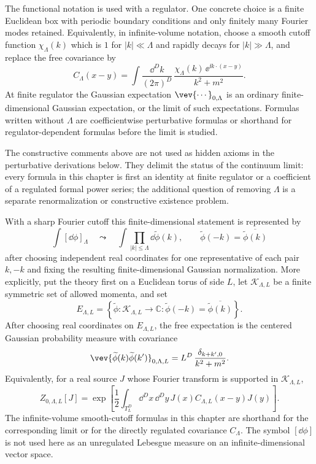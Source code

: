 \begin{definition}
The functional notation is used with a regulator. One concrete choice is a
finite Euclidean box with periodic boundary conditions and only finitely many
Fourier modes retained. Equivalently, in infinite-volume notation, choose a
smooth cutoff function \(\chi_\Lambda(k)\) which is \(1\) for
\(|k|\ll\Lambda\) and rapidly decays for \(|k|\gg\Lambda\), and replace the
free covariance by
\[
  C_\Lambda(x-y)
  =
  \int \frac{\dd^D k}{(2\pi)^D}\,
  \frac{\chi_\Lambda(k)\,\ee^{\ii k\cdot(x-y)}}
  {k^2+m^2}.
\]
At finite regulator the Gaussian expectation \(\vev{\cdots}_{0,\Lambda}\) is
an ordinary finite-dimensional Gaussian expectation, or the limit of such
expectations. Formulas written without \(\Lambda\) are coefficientwise
perturbative formulas or shorthand for regulator-dependent formulas before
the limit is studied.
\end{definition}

\begin{remark}
The constructive comments above are not used as hidden axioms in the
perturbative derivations below.  They delimit the status of the continuum
limit: every formula in this chapter is first an identity at finite regulator
or a coefficient of a regulated formal power series; the additional question
of removing \(\Lambda\) is a separate renormalization or constructive
existence problem.
\end{remark}

\begin{definition}
\label{def:finite-fourier-cutoff-gaussian-scalar-datum}
With a sharp Fourier cutoff this finite-dimensional statement is represented
by
\[
  \int[\dd\phi]_\Lambda
  \quad\leadsto\quad
  \int\prod_{|k|\le\Lambda}\dd\widetilde\phi(k),
  \qquad
  \widetilde\phi(-k)=\overline{\widetilde\phi(k)}
\]
after choosing independent real coordinates for one representative of each
pair \(k,-k\) and fixing the resulting finite-dimensional Gaussian
normalization.  More explicitly, put the theory first on a Euclidean torus of
side \(L\), let \(\mathcal K_{\Lambda,L}\) be a finite symmetric set of
allowed momenta, and set
\[
  E_{\Lambda,L}
  =
  \left\{
    \widetilde\phi:\mathcal K_{\Lambda,L}\to\mathbb C:
    \widetilde\phi(-k)=\overline{\widetilde\phi(k)}
  \right\}.
\]
After choosing real coordinates on \(E_{\Lambda,L}\), the free expectation is
the centered Gaussian probability measure with covariance
\[
  \vev{\widetilde\phi(k)\widetilde\phi(k')}_{0,\Lambda,L}
  =
  L^D\,\frac{\delta_{k+k',0}}{k^2+m^2}.
\]
Equivalently, for a real source \(J\) whose Fourier transform is supported in
\(\mathcal K_{\Lambda,L}\),
\[
  Z_{0,\Lambda,L}[J]
  =
  \exp\left[
    \frac12
    \int_{T_L^D}\dd^Dx\,\dd^Dy\,
    J(x)C_{\Lambda,L}(x-y)J(y)
  \right].
\]
The infinite-volume smooth-cutoff formulas in this chapter are shorthand for
the corresponding limit or for the directly regulated covariance
\(C_\Lambda\).  The symbol \([\dd\phi]\) is not used here as an unregulated
Lebesgue measure on an infinite-dimensional vector space.
\end{definition}

